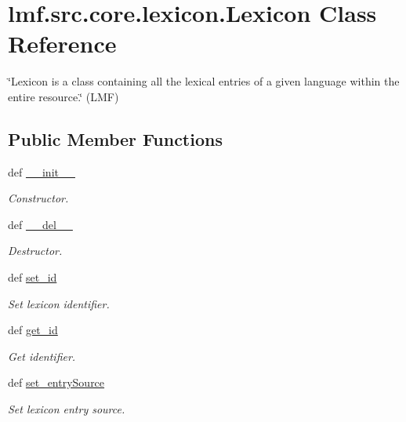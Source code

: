 \hypertarget{classlmf_1_1src_1_1core_1_1lexicon_1_1_lexicon}{\section{lmf.\+src.\+core.\+lexicon.\+Lexicon Class Reference}
\label{classlmf_1_1src_1_1core_1_1lexicon_1_1_lexicon}
}


\char`\"{}\+Lexicon is a class containing all the lexical entries of a given language within the entire resource.\char`\"{} (L\+M\+F)  


\subsection*{Public Member Functions}
\begin{DoxyCompactItemize}
\item 
def \hyperlink{classlmf_1_1src_1_1core_1_1lexicon_1_1_lexicon_a82ea3cefcbda289ccdd5d9f9e4dcb501}{\+\_\+\+\_\+init\+\_\+\+\_\+}
\begin{DoxyCompactList}\small\item\em Constructor. \end{DoxyCompactList}\item 
def \hyperlink{classlmf_1_1src_1_1core_1_1lexicon_1_1_lexicon_a50ac4bdb09d0854845ebbb0817fd66b3}{\+\_\+\+\_\+del\+\_\+\+\_\+}
\begin{DoxyCompactList}\small\item\em Destructor. \end{DoxyCompactList}\item 
def \hyperlink{classlmf_1_1src_1_1core_1_1lexicon_1_1_lexicon_a0872c7337c620b3b634cbe90f86a0166}{set\+\_\+id}
\begin{DoxyCompactList}\small\item\em Set lexicon identifier. \end{DoxyCompactList}\item 
def \hyperlink{classlmf_1_1src_1_1core_1_1lexicon_1_1_lexicon_a9594fe365aa2f688e72865a09c254132}{get\+\_\+id}
\begin{DoxyCompactList}\small\item\em Get identifier. \end{DoxyCompactList}\item 
def \hyperlink{classlmf_1_1src_1_1core_1_1lexicon_1_1_lexicon_a886cb3031f11cd63a6cf27103a963ae1}{set\+\_\+entry\+Source}
\begin{DoxyCompactList}\small\item\em Set lexicon entry source. \end{DoxyCompactList}\item 

\end{DoxyCompactItemize}
